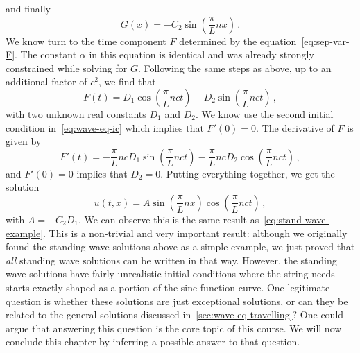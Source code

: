 and finally
\begin{equation}
  G(x)=-C_2\sin\left(\frac{\pi}{L}nx\right)\,.
\end{equation}
We know turn to the time component $F$ determined by the equation~\cref{eq:sep-var-F}. The
constant $\alpha$ in this equation is identical and was already strongly constrained while
solving for $G$. Following the same steps as above, up to an additional factor of $c^2$,
we find that
\begin{equation}
  F(t)=D_1\cos\left(\frac{\pi}{L}nc t\right)-D_2\sin\left(\frac{\pi}{L}nc t\right)\,,
\end{equation}
with two unknown real constants $D_1$ and $D_2$. We know use the second initial condition
in~\cref{eq:wave-eq-ic} which implies that $F'(0)=0$. The derivative of $F$ is given by
\begin{equation}
  F'(t)=-\frac{\pi}{L}ncD_1\sin\left(\frac{\pi}{L}nc t\right)-\frac{\pi}{L}ncD_2
  \cos\left(\frac{\pi}{L}nc t\right)\,,
\end{equation}
and $F'(0)=0$ implies that $D_2=0$. Putting everything together, we get the solution
\begin{equation}
  u(t,x)=A\sin\left(\frac{\pi}{L}nx\right)\cos\left(\frac{\pi}{L}nct\right)\,,
\end{equation}
with $A=-C_2D_1$. We can observe this is the same result as~\cref{eq:stand-wave-example}.
This is a non-trivial and very important result: although we originally found the standing
wave solutions above as a simple example, we just proved that \emph{all} standing wave
solutions can be written in that way. However, the standing wave solutions have fairly
unrealistic initial conditions where the string needs starts exactly shaped as a portion
of the sine function curve. One legitimate question is whether these solutions are just
exceptional solutions, or can they be related to the general solutions discussed
in~\cref{sec:wave-eq-travelling}? One could argue that answering this question is the core
topic of this course. We will now conclude this chapter by inferring a possible answer to
that question.
